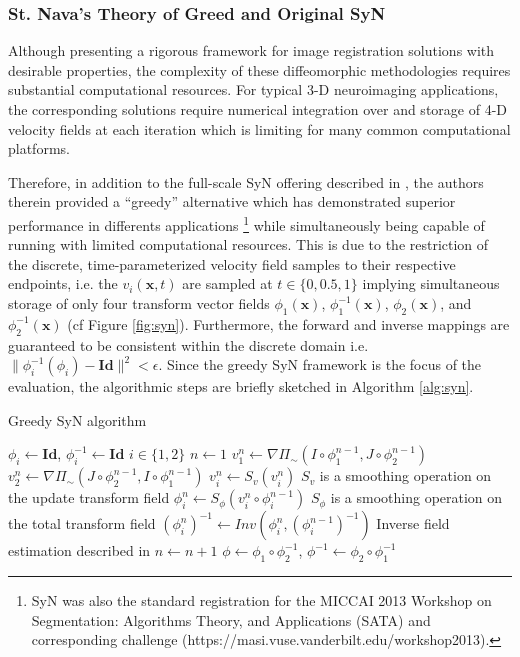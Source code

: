 \documentclass{frontiersSCNS}
\begin{document}
\subsubsection{St. Nava's Theory of Greed and Original SyN}

Although presenting a rigorous framework for image registration solutions
with desirable properties, the complexity of these diffeomorphic methodologies
requires substantial computational resources.  For typical 3-D neuroimaging
applications, the corresponding solutions require numerical integration over
and storage of 4-D velocity fields at each iteration which is limiting for
many common computational platforms.

Therefore, in addition to the full-scale
SyN offering described in \cite{avants2008}, the authors therein
provided a ``greedy'' alternative which has demonstrated superior performance
in differents applications \citep{avants2011,klein2009,murphy2011}%
\footnote{
SyN was also the standard registration for the MICCAI 2013
Workshop on Segmentation:  Algorithms Theory, and Applications (SATA)
and corresponding challenge (https://masi.vuse.vanderbilt.edu/workshop2013).
}
while simultaneously being capable of running with limited computational
resources.  This is due to the restriction of the discrete, time-parameterized
velocity field samples to their respective
endpoints, i.e. the $v_i(\mathbf{x},t)$ are sampled at $t \in \{0,0.5,1\}$
implying simultaneous storage of only four transform vector fields
$\phi_1(\mathbf{x})$,
$\phi_1^{-1}(\mathbf{x})$, $\phi_2(\mathbf{x})$, and $\phi_2^{-1}(\mathbf{x})$
(cf Figure \ref{fig:syn}).  Furthermore, the forward and inverse
mappings are guaranteed to be consistent within the discrete domain i.e. $\|
\phi_i^{-1}(\phi_i) - \mathbf{Id} \|^2 < \epsilon$.   
Since the greedy SyN framework is the focus of the evaluation,
the algorithmic steps are briefly sketched
in Algorithm \ref{alg:syn}.

\begin{algorithm}
\caption{Greedy SyN algorithm}
\label{alg:syn}
\begin{algorithmic}
\State $\phi_i \leftarrow \mathbf{Id}$, $\phi_i^{-1} \leftarrow \mathbf{Id}$
\Comment $i \in \{1,2\}$
\State $n \leftarrow 1$
  \State $v_1^n \leftarrow \nabla \Pi_{\sim} \left(I\circ\phi_1^{n-1},J\circ\phi_2^{n-1}\right)$
  \State $v_2^n \leftarrow \nabla \Pi_{\sim} \left(J\circ\phi_2^{n-1},I\circ\phi_1^{n-1}\right)$
  \State $v_i^n \leftarrow S_v( v_i^n )$      \Comment $S_v$ is a smoothing operation on the update transform field
  \State $\phi_i^n \leftarrow S_\phi( v_i^n \circ \phi_i^{n-1} )$      \Comment $S_\phi$ is a smoothing operation on the total transform field
  \State $\left(\phi_i^n\right)^{-1} \leftarrow Inv\left(\phi_i^n, \left(\phi_i^{n-1}\right)^{-1}\right)$
    \Comment Inverse field estimation described in \cite{avants2008}
  \State $n \leftarrow n + 1$
\EndWhile
\State \Return $\phi \leftarrow \phi_1 \circ \phi_2^{-1}$, $\phi^{-1} \leftarrow \phi_2 \circ \phi_1^{-1}$
\end{algorithmic}
\end{algorithm}
\end{document}

